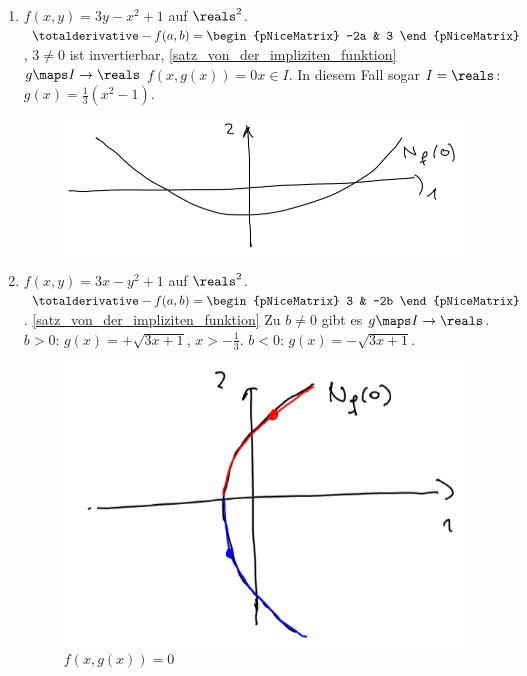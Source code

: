 \begin{beispiele*}
  \begin{enumerate}
    \item \( f(x,y)=3y-x^2+1 \) auf \( \reals^2 \). \( \totalderivative-{f}(a,b)=\begin{pNiceMatrix} -2a & 3 \end{pNiceMatrix} \), \( 3\neq 0 \) ist invertierbar, \ref{satz_von_der_impliziten_funktion} \timplies \texists  \( g\maps I\to \reals \) \sd \( f(x,g(x))=0 \)\tforall \( x\in I \). In diesem Fall sogar \( I=\reals \): \( g(x)=\frac{1}{3}(x^2-1) \).
    \begin{figure}[H]
      \centering
      \includegraphics[width=0.5\linewidth]{figures/implizite_funktion_beispiel_kein_eingeschraenkter_definitionsbereich}
      \label{fig:implizite_funktion_beispiel_kein_eingeschraenkter_definitionsbereich}
    \end{figure}
    \item \( f(x,y)=3x-y^2+1 \) auf \( \reals^2 \). \( \totalderivative-{f}(a,b)=\begin{pNiceMatrix} 3 & -2b \end{pNiceMatrix} \). \ref{satz_von_der_impliziten_funktion} \timplies Zu \( b\neq 0 \) gibt es \( g\maps I\to \reals \). \( b>0 \): \( g(x)=+\sqrt{3x+1} \), \( x>-\frac{1}{3} \). \( b<0 \): \( g(x)=-\sqrt{3x+1} \).
    \begin{figure}[H]
      \centering
      \includegraphics[width=0.5\linewidth]{figures/implizite_funktion_beispiel_eingeschraenkter_definitionsbereich}
      \caption*{\( f(x,g(x))=0 \)}
      \label{fig:implizite_funktion_beispiel_eingeschraenkter_definitionsbereich}
    \end{figure}
  \end{enumerate}
\end{beispiele*}
